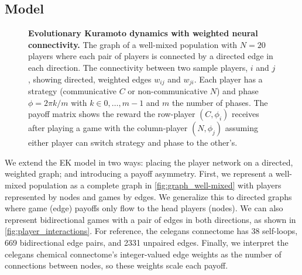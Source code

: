 \documentclass[pdflatex,twocolumn,sn-nature,super]{sn-jnl}
\begin{document}
\subsection{Model}
\begin{figure*}
  \centering
  \begin{subcaptiongroup}
      {\label{fig:payoff_matrix}\captiontext*{}}{%
      {\label{fig:player_interactions}\captiontext*{}}{%
      {\label{fig:graph_well-mixed}\captiontext*{}}{%
    {}%
  }}}
  \end{subcaptiongroup}
  \caption{
    \textbf{
      Evolutionary Kuramoto dynamics with weighted neural connectivity.
    }
    The graph of a well-mixed population with $N=20$ players
    where each pair of players is connected by a directed edge in each direction.
    The connectivity between two sample players, $i$ and $j$,
    showing directed, weighted edges $w_{ij}$ and $w_{ji}$.
    Each player has a strategy (communicative $C$ or non-communicative $N$)
    and phase $\phi = 2\pi k/m$ with $k \in 0,\ldots,m-1$
    and $m$ the number of phases.
    The payoff matrix shows the reward the row-player $(C, \phi_i)$
    receives after playing a game with the column-player $(N, \phi_j)$
    assuming either player can switch strategy and phase to the other's.
  }\label{fig:connectivity}
\end{figure*}

We extend the EK model in two ways:
placing the player network on a directed, weighted graph;
and introducing a payoff asymmetry.
First, we represent a well-mixed population
as a complete graph in \cref{fig:graph_well-mixed}
with players represented by nodes and games by edges.
We generalize this to directed graphs
where game (edge) payoffs only flow to the head players (nodes).
We can also represent bidirectional games with
a pair of edges in both directions,
as shown in \cref{fig:player_interactions}.
For reference, the \gls{celegans} connectome
has \num{38} self-loops, \num{669} bidirectional edge pairs,
and \num{2331} unpaired edges.
Finally, we interpret the \gls{celegans} chemical connectome's
integer-valued edge weights
as the number of connections between nodes,
so these weights scale each payoff.
\end{document}
